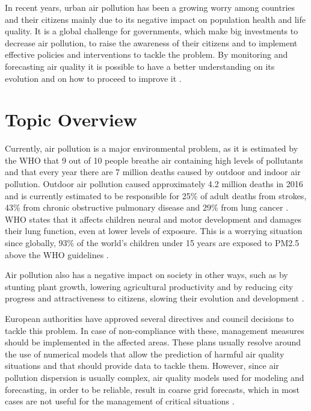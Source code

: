 \cleardoublepage
\label{chap:intro}

In recent years, urban air pollution has been a growing worry among countries and their citizens mainly due to its negative impact on population health and life quality. It is a global challenge for governments, which make big investments to decrease air pollution, to raise the awareness of their citizens and to implement effective policies and interventions to tackle the problem. By monitoring and forecasting air quality it is possible to have a better understanding on its evolution and on how to proceed to improve it \cite{WHO2018}.

\section{Topic Overview}

Currently, air pollution is a major environmental problem, as it is estimated by the \ac{WHO} that 9 out of 10 people breathe air containing high levels of pollutants and that every year there are 7 million deaths caused by outdoor and indoor air pollution. Outdoor air pollution caused approximately 4.2 million deaths in 2016 and is currently estimated to be responsible for 25\% of adult deaths from strokes, 43\% from chronic obstructive pulmonary disease and 29\% from lung cancer \cite{WHO2018}. WHO states that it affects children neural and motor development and damages their lung function, even at lower levels of exposure. This is a worrying situation since globally, 93\% of the world’s children under 15 years are exposed to \ac{PM2.5} above the WHO guidelines \cite{WHO2018a}.

Air pollution also has a negative impact on society in other ways, such as by stunting plant growth, lowering agricultural productivity and by reducing city progress and attractiveness to citizens, slowing their evolution and development \cite{GSMA2018}.

European authorities have approved several directives and council decisions to tackle this problem. In case of non-compliance with these, management measures should be implemented in the affected areas. These plans usually resolve around the use of numerical models that allow the prediction of harmful air quality situations and that should provide data to tackle them.
However, since air pollution dispersion is usually complex, air quality models used for modeling and forecasting, in order to be reliable, result in coarse grid forecasts, which in most cases are not useful for the management of critical situations \cite{Russo2014}.

